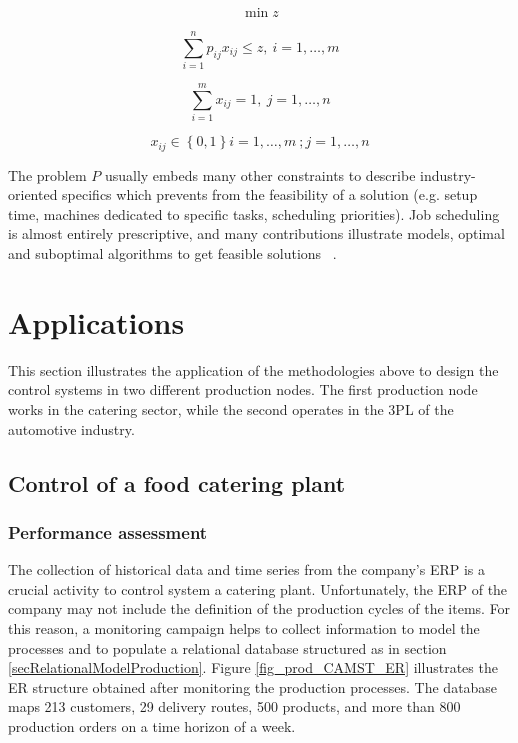 \begin{equation}
    \min{z}
\end{equation}

\begin{equation}
    \sum_{i=1}^{n}{p_{ij}x_{ij}\le z,\ i=1,\ldots,m}
\end{equation}

\begin{equation}
    \sum_{i=1}^{m}{x_{ij}=1,\ j=1,\ldots,n}
\end{equation}

\begin{equation}
    x_{ij}\in\left\{0,1\right\}i=1,\ldots,m\ ;j=1,\ldots,n
\end{equation}

The problem $P$ usually embeds many other constraints to describe industry-oriented specifics which prevents from the feasibility of a solution (e.g. setup time, machines dedicated to specific tasks, scheduling priorities). Job scheduling is almost entirely prescriptive, and many contributions illustrate models, optimal and suboptimal algorithms to get feasible solutions ~\cite{Pinedo2009}.

\section{Applications} 
This section illustrates the application of the methodologies above to design the control systems in two different production nodes. The first production node works in the catering sector, while the second operates in the 3PL of the automotive industry.

\subsection{Control of a food catering plant} \label{secFoodCateringControl}

\subsubsection{Performance assessment}

The collection of historical data and time series from the company’s ERP is a crucial activity to control system a catering plant. Unfortunately, the ERP of the company may not include the definition of the production cycles of the items. For this reason, a monitoring campaign helps to collect information to model the processes and to populate a relational database structured as in section \ref{secRelationalModelProduction}. Figure \ref{fig_prod_CAMST_ER} illustrates the ER structure obtained after monitoring the production processes. The database maps 213 customers, 29 delivery routes, 500 products, and more than 800 production orders on a time horizon of a week.

